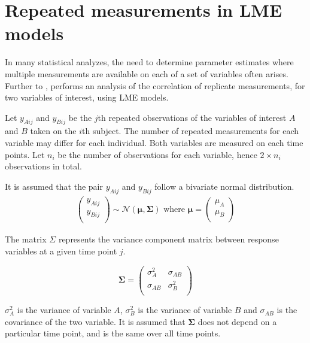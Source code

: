 \documentclass[12pt, a4paper]{report}
\theoremstyle{plain}
\theoremstyle{definition}
\theoremstyle{remark}
\begin{document}
\section{Repeated measurements in LME models}

In many statistical analyzes, the need to determine parameter estimates where multiple measurements are available on each of a set of variables often arises. Further to \citet{lam}, \citet{hamlett} performs an analysis of the correlation of replicate measurements, for two variables of interest, using LME models.

Let $y_{Aij}$ and $y_{Bij}$ be the $j$th repeated observations of the variables of interest $A$ and $B$ taken on the $i$th subject. The number of repeated measurements for each variable may differ for each individual.
Both variables are measured on each time points. Let $n_{i}$ be the number of observations for each variable, hence $2\times n_{i}$ observations in total.

It is assumed that the pair $y_{Aij}$ and $y_{Bij}$ follow a bivariate normal distribution.
\begin{eqnarray*}
	\left(
	\begin{array}{c}
		y_{Aij} \\
		y_{Bij} \\
	\end{array}
	\right) \sim \mathcal{N}(
	\boldsymbol{\mu}, \boldsymbol{\Sigma})\mbox{   where } \boldsymbol{\mu} = \left(
	\begin{array}{c}
		\mu_{A} \\
		\mu_{B} \\
	\end{array}
	\right)
\end{eqnarray*}

The matrix $\Sigma$ represents the variance component matrix between response variables at a given time point $j$.

\[
\boldsymbol{\Sigma} = \left( \begin{array}{cc}
\sigma^2_{A} & \sigma_{AB} \\
\sigma_{AB} & \sigma^2_{B}\\
\end{array}   \right)
\]

$\sigma^2_{A}$ is the variance of variable $A$, $\sigma^2_{B}$ is the variance of variable $B$ and $\sigma_{AB}$ is the covariance of the two variable. It is assumed that $\boldsymbol{\Sigma}$ does not depend on a particular time point, and is the same over all time points.
\end{document}
